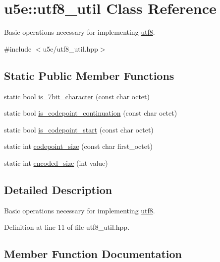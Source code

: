 \hypertarget{classu5e_1_1utf8__util}{}\section{u5e\+:\+:utf8\+\_\+util Class Reference}
\label{classu5e_1_1utf8__util}


Basic operations necessary for implementing \hyperlink{classu5e_1_1utf8}{utf8}.  




{\ttfamily \#include $<$u5e/utf8\+\_\+util.\+hpp$>$}

\subsection*{Static Public Member Functions}
\begin{DoxyCompactItemize}
\item 
static bool \hyperlink{classu5e_1_1utf8__util_a16bd32801dbac091a8034cc5acd6ae10}{is\+\_\+7bit\+\_\+character} (const char octet)
\item 
static bool \hyperlink{classu5e_1_1utf8__util_a404648033dd6c6bb4627f521204fea1d}{is\+\_\+codepoint\+\_\+continuation} (const char octet)
\item 
static bool \hyperlink{classu5e_1_1utf8__util_a522009c40678d411aa01b520fab756e6}{is\+\_\+codepoint\+\_\+start} (const char octet)
\item 
static int \hyperlink{classu5e_1_1utf8__util_ab51ca43f1228e81f195ab7ffe144fb42}{codepoint\+\_\+size} (const char first\+\_\+octet)
\item 
static int \hyperlink{classu5e_1_1utf8__util_a357cfe45396ba74cd39ae9de587383f6}{encoded\+\_\+size} (int value)
\end{DoxyCompactItemize}


\subsection{Detailed Description}
Basic operations necessary for implementing \hyperlink{classu5e_1_1utf8}{utf8}. 

Definition at line 11 of file utf8\+\_\+util.\+hpp.



\subsection{Member Function Documentation}
